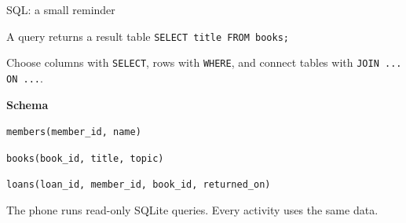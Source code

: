 \begin{frame}[t]{SQL: a small reminder}
\begin{block}{A query returns a result table}
\texttt{SELECT title FROM books;}\par\smallskip
Choose columns with \texttt{SELECT}, rows with \texttt{WHERE}, and connect
tables with \texttt{JOIN ... ON ...}.
\end{block}\small
\textbf{Schema}\par
\texttt{members(member\_id, name)}\par
\texttt{books(book\_id, title, topic)}\par
\texttt{loans(loan\_id, member\_id, book\_id, returned\_on)}
\vspace{3mm}\par The phone runs read-only SQLite queries. Every activity uses the same data.
\end{frame}
